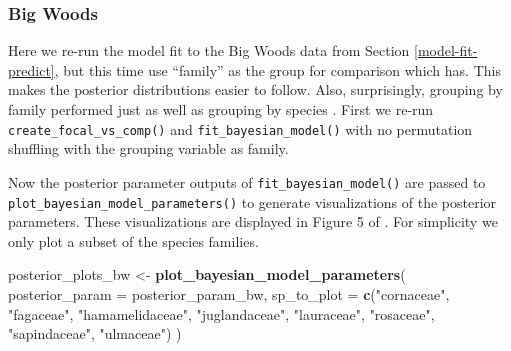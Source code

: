 \documentclass[12pt]{article}
\newenvironment{Shaded}{\begin{snugshade}}{\end{snugshade}}
\newcommand{\DataTypeTok}[1]{\textcolor[rgb]{0.13,0.29,0.53}{#1}}
\newcommand{\KeywordTok}[1]{\textcolor[rgb]{0.13,0.29,0.53}{\textbf{#1}}}
\newcommand{\NormalTok}[1]{#1}
\newcommand{\OperatorTok}[1]{\textcolor[rgb]{0.81,0.36,0.00}{\textbf{#1}}}
\newcommand{\OtherTok}[1]{\textcolor[rgb]{0.56,0.35,0.01}{#1}}
\newcommand{\StringTok}[1]{\textcolor[rgb]{0.31,0.60,0.02}{#1}}
\begin{document}
\hypertarget{big-woods-6}{%
\subsubsection{Big Woods}\label{big-woods-6}}

Here we re-run the model fit to the Big Woods data from Section
\ref{model-fit-predict}, but this time use ``family'' as the group for
comparison which has. This makes the posterior distributions easier to
follow. Also, surprisingly, grouping by family performed just as well as
grouping by species \citet{allen_permutation_2020}. First we re-run
\texttt{create\_focal\_vs\_comp()} and \texttt{fit\_bayesian\_model()}
with no permutation shuffling with the grouping variable as family.

\begin{Shaded}
\end{Shaded}

Now the posterior parameter outputs of \texttt{fit\_bayesian\_model()}
are passed to \texttt{plot\_bayesian\_model\_parameters()} to generate
visualizations of the posterior parameters. These visualizations are
displayed in Figure 5 of \citet{allen_permutation_2020}. For simplicity
we only plot a subset of the species families.

\begin{Shaded}
\begin{Highlighting}[]
\NormalTok{posterior_plots_bw <-}\StringTok{ }\KeywordTok{plot_bayesian_model_parameters}\NormalTok{(}
  \DataTypeTok{posterior_param =}\NormalTok{ posterior_param_bw,}
  \DataTypeTok{sp_to_plot =} \KeywordTok{c}\NormalTok{(}\StringTok{"cornaceae"}\NormalTok{, }\StringTok{"fagaceae"}\NormalTok{, }\StringTok{"hamamelidaceae"}\NormalTok{, }\StringTok{"juglandaceae"}\NormalTok{, }
                 \StringTok{"lauraceae"}\NormalTok{, }\StringTok{"rosaceae"}\NormalTok{, }\StringTok{"sapindaceae"}\NormalTok{, }\StringTok{"ulmaceae"}\NormalTok{)}
\NormalTok{)}
\end{Highlighting}
\end{Shaded}
\end{document}
